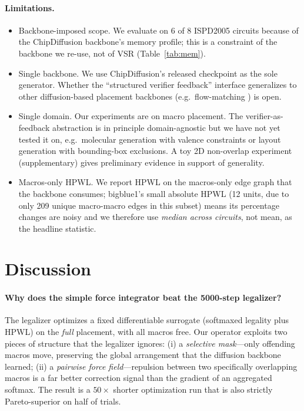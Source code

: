 \documentclass{article}
\begin{document}
\paragraph{Limitations.}
\begin{itemize}
\item Backbone-imposed scope.  We evaluate on 6 of 8 ISPD2005 circuits
because of the ChipDiffusion backbone's memory profile; this is a constraint
of the backbone we re-use, not of VSR (Table~\ref{tab:mem}).
\item Single backbone.  We use ChipDiffusion's released checkpoint as the
sole generator.  Whether the ``structured verifier feedback'' interface
generalizes to other diffusion-based placement backbones (e.g.\ flow-matching
\cite{chipflow}) is open.
\item Single domain.  Our experiments are on macro placement.  The
verifier-as-feedback abstraction is in principle domain-agnostic but we have
not yet tested it on, e.g.\ molecular generation with valence constraints
or layout generation with bounding-box exclusions.  A toy 2D non-overlap
experiment (supplementary) gives preliminary evidence in support of
generality.
\item Macros-only HPWL.  We report HPWL on the macros-only edge graph that
the backbone consumes; bigblue1's small absolute HPWL (12 units, due to only
209 unique macro-macro edges in this subset) means its percentage changes
are noisy and we therefore use \emph{median across circuits}, not mean,
as the headline statistic.
\end{itemize}

\section{Discussion}

\paragraph{Why does the simple force integrator beat the 5000-step legalizer?}
The legalizer optimizes a fixed differentiable surrogate (softmaxed legality
plus HPWL) on the \emph{full} placement, with all macros free.  Our operator
exploits two pieces of structure that the legalizer ignores: (i) a
\emph{selective mask}---only offending macros move, preserving the global
arrangement that the diffusion backbone learned; (ii) a \emph{pairwise force
field}---repulsion between two specifically overlapping macros is a far
better correction signal than the gradient of an aggregated softmax.  The
result is a $50\times$ shorter optimization run that is also strictly
Pareto-superior on half of trials.
\end{document}
